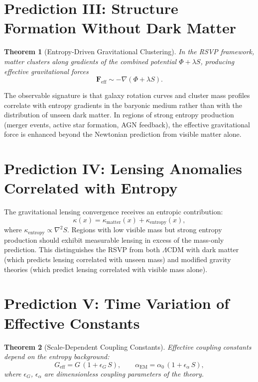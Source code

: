 \documentclass[12pt,a4paper,openany]{book}
\theoremstyle{plain}
\newtheorem{theorem}{Theorem}[chapter]
\theoremstyle{definition}
\theoremstyle{remark}
\begin{document}
\section{Prediction III: Structure Formation Without Dark Matter}

\begin{theorem}[Entropy-Driven Gravitational Clustering]
\label{thm:clustering}
In the RSVP framework, matter clusters along gradients of the combined potential $\Phi + \lambda S$, producing effective gravitational forces
\[
\mathbf{F}_{\mathrm{eff}} \sim -\nabla(\Phi + \lambda S).
\]
\end{theorem}

The observable signature is that galaxy rotation curves and cluster mass profiles correlate with entropy gradients in the baryonic medium rather than with the distribution of unseen dark matter. In regions of strong entropy production (merger events, active star formation, AGN feedback), the effective gravitational force is enhanced beyond the Newtonian prediction from visible matter alone.

\section{Prediction IV: Lensing Anomalies Correlated with Entropy}

The gravitational lensing convergence receives an entropic contribution:
\[
\kappa(x) = \kappa_{\mathrm{matter}}(x) + \kappa_{\mathrm{entropy}}(x),
\]
where $\kappa_{\mathrm{entropy}} \propto \nabla^2 S$. Regions with low visible mass but strong entropy production should exhibit measurable lensing in excess of the mass-only prediction. This distinguishes the RSVP from both $\Lambda$CDM with dark matter (which predicts lensing correlated with unseen mass) and modified gravity theories (which predict lensing correlated with visible mass alone).

\section{Prediction V: Time Variation of Effective Constants}

\begin{theorem}[Scale-Dependent Coupling Constants]
\label{thm:varying_constants}
Effective coupling constants depend on the entropy background:
\[
G_{\mathrm{eff}} = G\,(1 + \epsilon_G\, S), \qquad \alpha_{\mathrm{EM}} = \alpha_0\,(1 + \epsilon_\alpha\, S),
\]
where $\epsilon_G$, $\epsilon_\alpha$ are dimensionless coupling parameters of the theory.
\end{theorem}
\end{document}
